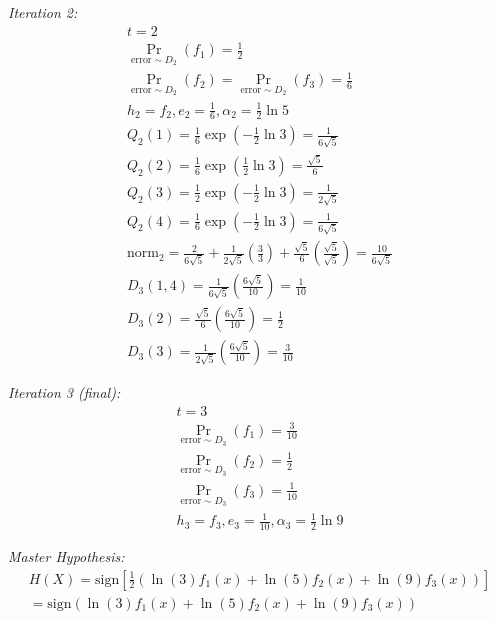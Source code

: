 \documentclass[12pt]{article}
\begin{document}
\begin{enumerate}
\textit{ Iteration 2:}
\begin{eqnarray*}
t=2\\
\Pr_{\text{error} \sim D_2}\left(f_1\right) = \frac{1}{2} \\
\Pr_{\text{error} \sim D_2}\left(f_2\right)= \Pr_{\text{error} \sim D_2}\left(f_3\right) = \frac{1}{6} \\
h_2 = f_2, e_2 = \frac{1}{6}, \alpha_2 = \frac{1}{2} \ln 5 \\ 
Q_2(1) = \frac{1}{6} \exp \left( -\frac{1}{2}  \ln 3 \right) = \frac{1}{6\sqrt{5}} \\
Q_2(2) = \frac{1}{6} \exp \left( \frac{1}{2}  \ln 3 \right) = \frac{\sqrt{5}}{6} \\
Q_2(3) = \frac{1}{2} \exp \left( -\frac{1}{2}  \ln 3 \right) =\frac{1}{2\sqrt{5}}\\
Q_2(4) = \frac{1}{6} \exp \left( -\frac{1}{2}  \ln 3 \right)= \frac{1}{6\sqrt{5}}  \\
\text{norm}_2 = \frac{2}{6\sqrt{5}} + \frac{1}{2\sqrt{5}}\left(\frac{3}{3}\right) + \frac{\sqrt{5}}{6}\left(\frac{\sqrt{5}}{\sqrt{5}} \right)= \frac{10}{6\sqrt{5}} \\
D_3(1,4) =  \frac{1}{6\sqrt{5}} \left(\frac{6\sqrt{5}}{10}\right) = \frac{1}{10}\\
D_3(2) = \frac{\sqrt{5}}{6} \left(\frac{6\sqrt{5}}{10}\right) = \frac{1}{2}\\
D_3(3) = \frac{1}{2\sqrt{5}} \left(\frac{6\sqrt{5}}{10}\right) = \frac{3}{10}
\end{eqnarray*}

\textit{ Iteration 3 (final):}
\begin{eqnarray*}
t=3\\
\Pr_{\text{error} \sim D_3}\left(f_1\right) = \frac{3}{10} \\
\Pr_{\text{error} \sim D_3}\left(f_2\right)= \frac{1}{2} \\
\Pr_{\text{error} \sim D_3}\left(f_3\right) = \frac{1}{10} \\
h_3 = f_3, e_3 = \frac{1}{10}, \alpha_3 = \frac{1}{2} \ln 9
\end{eqnarray*}

\textit{Master Hypothesis:}
\begin{eqnarray*}
H(X) = \text{sign}\left[  \frac{1}{2}\left(\ln(3) f_1(x) +  \ln(5) f_2(x) + \ln(9) f_3(x)   \right)\right] \\
 = \text{sign} \left(\ln(3) f_1(x) +  \ln(5) f_2(x) + \ln(9) f_3(x) \right)
\end{eqnarray*}




\end{enumerate}
\end{document}
